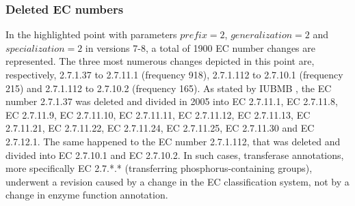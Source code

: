 \subsubsection{Deleted EC numbers}

In the highlighted point with parameters $prefix = 2$, $generalization = 2$ and $specialization = 2$ in versions 7-8, a total of 1900 EC number changes are represented. The three most numerous changes depicted in this point are, respectively, 2.7.1.37 to 2.7.11.1 (frequency 918), 2.7.1.112 to 2.7.10.1 (frequency 215) and 2.7.1.112 to 2.7.10.2 (frequency 165). As stated by IUBMB \cite{***}, the EC number 2.7.1.37 was deleted and divided in 2005 into EC 2.7.11.1, EC 2.7.11.8, EC 2.7.11.9, EC 2.7.11.10, EC 2.7.11.11, EC 2.7.11.12, EC 2.7.11.13, EC 2.7.11.21, EC 2.7.11.22, EC 2.7.11.24, EC 2.7.11.25, EC 2.7.11.30 and EC 2.7.12.1. The same happened to the EC number 2.7.1.112, that was deleted and divided into EC 2.7.10.1 and EC 2.7.10.2. In such cases, transferase annotations, more specifically EC 2.7.*.* (transferring phosphorus-containing groups), underwent a revision caused by a change in the EC classification system, not by a change in enzyme function annotation.
